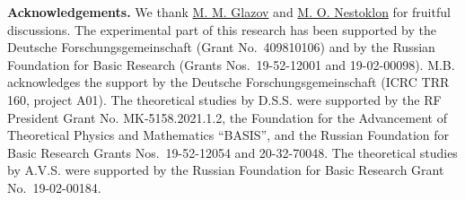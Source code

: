 \documentclass[twocolumn,showpacs,preprintnumbers,amsmath,amssymb,aps]{revtex4-1}
\begin{document}



{\bf Acknowledgements.} We thank
\href{https://orcid.org/0000-0003-4462-0749}{M. M. Glazov} and
\href{https://orcid.org/0000-0002-0454-342X}{M. O. Nestoklon} for
fruitful discussions. The experimental part of this research has been
supported by the Deutsche Forschungsgemeinschaft (Grant
No.~409810106) and by the Russian Foundation for Basic Research
(Grants Nos.~19-52-12001 and 19-02-00098). M.B. acknowledges the
support by the Deutsche Forschungsgemeinschaft (ICRC TRR 160,
project A01). The theoretical studies by D.S.S. were supported by
the RF President Grant No. MK-5158.2021.1.2, the Foundation for the
Advancement of Theoretical Physics and Mathematics ``BASIS'', and
the Russian Foundation for Basic Research Grants Nos.~19-52-12054
and 20-32-70048. The theoretical studies by A.V.S. were supported by
the Russian Foundation for Basic Research Grant No.~19-02-00184.


\end{document}
